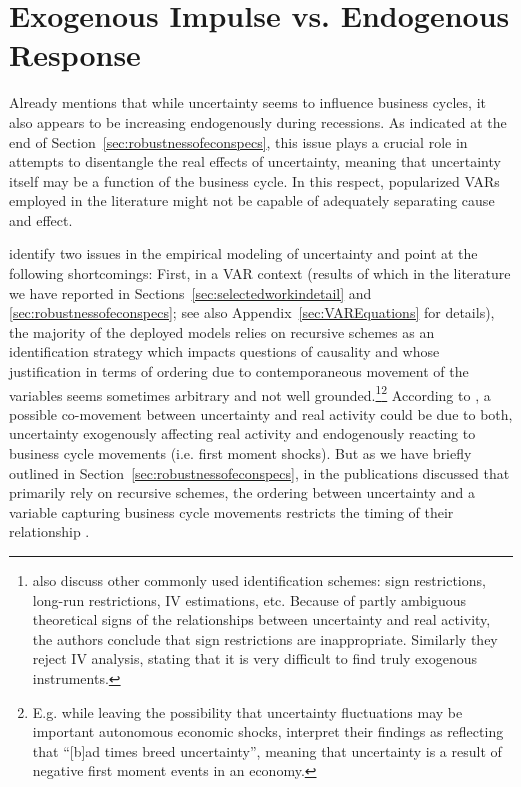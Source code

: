 \documentclass[a4paper,11pt,listof=nochaptergap,oneside,pointednumbers,bibtotoc,bigheadings,liststotoc,hidelinks]{scrbook}
\theoremstyle{mysatz}
\theoremstyle{mydefinition}
\theoremstyle{mytheorem}
\theoremstyle{mybemerkung}
\begin{document}
\section{Exogenous Impulse vs. Endogenous Response}
\label{sec:exoEndoJuradoetal}
Already \citet{bloom:14} mentions that while uncertainty seems to influence business cycles, it also appears to be increasing endogenously during recessions. As indicated at the end of Section~\ref{sec:robustnessofeconspecs}, this issue plays a crucial role in attempts to disentangle the real effects of uncertainty, meaning that uncertainty itself may be a function of the business cycle. In this respect, popularized VARs employed in the literature might not be capable of adequately separating cause and effect.

 \citet{ludvigsonetal:19} identify two issues in the empirical modeling of uncertainty and point at the following shortcomings: First, in a VAR context (results of which in the literature we have reported in Sections~\ref{sec:selectedworkindetail} and \ref{sec:robustnessofeconspecs}; see also Appendix~\ref{sec:VAREquations} for details), the majority of the deployed models relies on recursive schemes as an identification strategy which impacts questions of causality and whose justification in terms of ordering due to contemporaneous movement of the variables seems sometimes arbitrary and not well grounded.\footnote{\citet{ludvigsonetal:19} also discuss other commonly used identification schemes: sign restrictions, long-run restrictions, IV estimations, etc. Because of partly ambiguous theoretical signs of the relationships between uncertainty and real activity, the authors conclude that sign restrictions are inappropriate. Similarly they reject IV analysis, stating that it is very difficult to find truly exogenous instruments.}\footnote{E.g. while leaving the possibility that uncertainty fluctuations may be important autonomous economic shocks, \citet[p. 28]{bachmannetal:13} interpret their findings as reflecting that ``[b]ad times breed uncertainty'', meaning that uncertainty is a result of negative first moment events in an economy.} According to \citet{ludvigsonetal:19}, a possible co-movement between uncertainty and real activity could be due to both, uncertainty exogenously affecting real activity and endogenously reacting to business cycle movements (i.e. first moment shocks). But as we have briefly outlined in Section~\ref{sec:robustnessofeconspecs}, in the publications discussed that primarily rely on recursive schemes, the ordering between uncertainty and a variable capturing business cycle movements restricts the timing of their relationship \citep{ludvigsonetal:19}.
 
\end{document}
